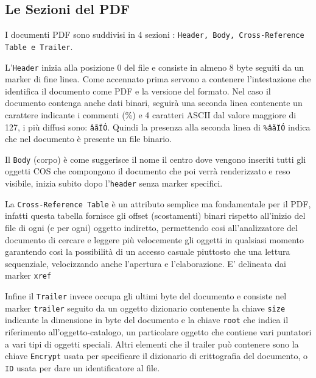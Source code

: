 \subsection{Le Sezioni del PDF}
I documenti PDF sono suddivisi in 4 sezioni : \texttt{Header, Body, Cross-Reference Table e Trailer}.
\par
L'\texttt{Header} inizia alla posizione 0 del file e consiste in almeno 8 byte seguiti da un marker di fine linea. Come accennato prima servono a contenere l'intestazione che identifica il documento come PDF e la versione del formato. Nel caso il documento contenga anche dati binari, seguirà una seconda linea contenente un carattere indicante i commenti (\%) e 4 caratteri ASCII dal valore maggiore di 127, i più diffusi sono: \texttt{âãÏÓ}. Quindi la presenza alla seconda linea di \texttt{\%âãÏÓ} indica che nel documento è presente un file binario.
\par
Il \texttt{Body} (corpo) è come suggerisce il nome il centro dove vengono inseriti tutti gli oggetti COS che compongono il documento che poi verrà renderizzato e reso visibile, inizia subito dopo l'\texttt{header} senza marker specifici.
\par
La \texttt{Cross-Reference Table} è un attributo semplice ma fondamentale per il PDF, infatti questa tabella fornisce gli offset (scostamenti) binari rispetto all'inizio del file di ogni (e per ogni) oggetto indiretto, permettendo cosi all'analizzatore del documento di cercare e leggere più velocemente  gli oggetti in qualsiasi momento garantendo così la possibilità di un accesso casuale piuttosto che una lettura sequenziale, velocizzando anche l'apertura e l'elaborazione. E' delineata dai marker \texttt{xref} 
\par
Infine il \texttt{Trailer} invece occupa gli ultimi byte del documento e consiste nel marker \texttt{trailer} seguito da un oggetto dizionario contenente la chiave \texttt{size} indicante la dimensione in byte del documento e la chiave \texttt{root} che indica il riferimento all'oggetto-catalogo, un particolare oggetto che contiene vari puntatori a vari tipi di oggetti speciali.
Altri elementi che il trailer può contenere sono la chiave 	\texttt{Encrypt} usata per specificare il dizionario di crittografia del documento, o \texttt{ID} usata per dare un identificatore al file.





%
%



